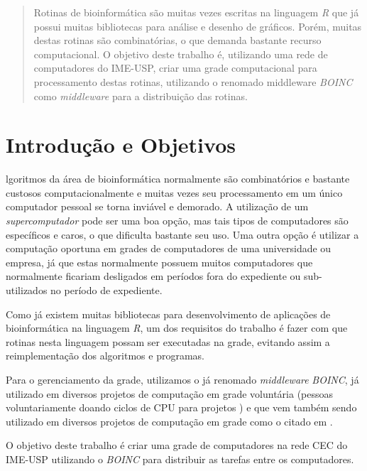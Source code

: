 \documentclass[b1,portrait]{sciposter}
\begin{document}
\begin{multicols}{2}

\begin{abstract}
Rotinas de bioinformática são muitas vezes escritas na linguagem \textit{R} que já possui
muitas bibliotecas para análise e desenho de gráficos. Porém, muitas destas rotinas são
combinatórias, o que demanda bastante recurso computacional. O objetivo deste trabalho é,
utilizando uma rede de computadores do IME-USP, criar uma grade computacional para processamento 
destas rotinas, utilizando o renomado middleware \textit{BOINC} como \textit{middleware} para
a distribuição das rotinas.

\end{abstract}

\section{Introdução e Objetivos}

lgoritmos da área de bioinformática normalmente são combinatórios e bastante custosos computacionalmente
e muitas vezes seu processamento em um único computador pessoal se torna inviável e demorado. A utilização de um 
\textit{supercomputador} pode ser uma boa opção, mas tais tipos de computadores são específicos e caros, o que 
dificulta bastante seu uso. Uma outra opção é utilizar a computação oportuna em grades de computadores de 
uma universidade ou empresa, já que estas normalmente possuem muitos computadores que normalmente ficariam desligados
 em períodos fora do expediente ou sub-utilizados no período de expediente. 

Como já existem muitas bibliotecas para desenvolvimento de aplicações de bioinformática na linguagem \textit{R}, um dos
requisitos do trabalho é fazer com que rotinas nesta linguagem possam ser executadas na grade, evitando assim 
a reimplementação dos algoritmos e programas. 

Para o gerenciamento da grade, utilizamos o já renomado \textit{middleware} \emph{BOINC}, já utilizado em diversos projetos
de computação em grade voluntária (pessoas voluntariamente doando ciclos de CPU para projetos ) e que vem também sendo utilizado
em diversos projetos de computação em grade como o citado em \cite{boinc}.

O objetivo deste trabalho é criar uma grade de computadores na rede CEC do IME-USP utilizando o \textit{BOINC} para distribuir as tarefas
entre os computadores.





\end{multicols}
\end{document}
